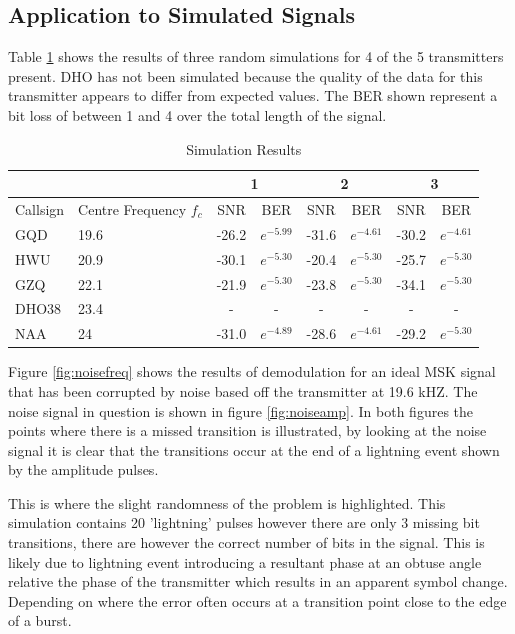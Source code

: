 \subsection{Application to Simulated Signals}

Table \ref{tab:simresults1} shows the results of three random simulations for 4 of the 5 transmitters present. DHO has not been simulated because the quality of the data for this transmitter appears to differ from expected values. The BER shown represent a bit loss of between 1 and 4 over the total length of the signal.


\begin{table}[h!]
\centering
\begin{tabular}{l|l|c|c|c|c|c|c}
         &                        & \multicolumn{2}{c}{1} & \multicolumn{2}{|c}{2} & \multicolumn{2}{|c}{3} \\
         \hline
Callsign & Centre Frequency $f_c$ & SNR    & BER          & SNR    & BER          & SNR    & BER          \\
\hline
GQD      & 19.6                   & -26.2  & $e^{-5.99}$ & -31.6  & $e^{-4.61}$ & -30.2  & $e^{-4.61}$ \\
HWU      & 20.9                   & -30.1  & $e^{-5.30}$ & -20.4  & $e^{-5.30}$ & -25.7  & $e^{-5.30}$ \\
GZQ      & 22.1                   & -21.9  & $e^{-5.30}$ & -23.8  & $e^{-5.30}$ & -34.1  & $e^{-5.30}$ \\
DHO38    & 23.4                   & -      & -            & -      & -            & -      & -            \\
NAA      & 24                     & -31.0  & $e^{-4.89}$ & -28.6  & $e^{-4.61}$ & -29.2  & $e^{-5.30}$
\end{tabular}
\caption{Simulation Results}
\label{tab:simresults1}
\end{table}

Figure \ref{fig:noisefreq} shows the results of demodulation for an ideal MSK signal that has been corrupted by noise based off the transmitter at 19.6 kHZ. The noise signal in question is shown in figure \ref{fig:noiseamp}. In both figures the points where there is a missed transition is illustrated, by looking at the noise signal it is clear that the transitions occur at the end of a lightning event shown by the amplitude pulses. 

This is where the slight randomness of the problem is highlighted. This simulation contains 20 'lightning' pulses however there are only 3 missing bit transitions, there are however the correct number of bits in the signal. This is likely due to lightning event introducing a resultant phase at an obtuse angle relative the phase of the transmitter which results in an apparent symbol change. Depending on where the error often occurs at a transition point close to the edge of a burst. 

